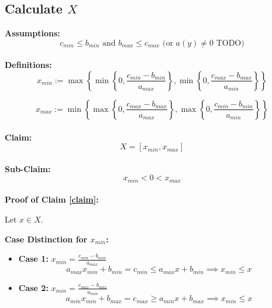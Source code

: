 \subsection{Calculate \texorpdfstring{$X$}{X}}
\textbf{Assumptions:}
\begin{equation}
	c_{min} \leq b_{min} \text{ and } b_{max} \leq c_{max} \text{ (or } a(y) \neq 0 \text{ TODO)}
\end{equation}
\\
\textbf{Definitions:}
\begin{equation}
	x_{min} := \max \left\{ \min\left\{ 0, \frac{c_{min} - b_{min}}{a_{max}} \right\}, \min\left\{ 0, \frac{c_{max} - b_{max}}{a_{min}} \right\} \right\}
\end{equation}

\begin{equation}
	x_{max} := \min \left\{ \max\left\{ 0, \frac{c_{max} - b_{max}}{a_{max}} \right\}, \max\left\{ 0, \frac{c_{min} - b_{min}}{a_{min}} \right\} \right\}
\end{equation}
\\
\textbf{Claim:}
\begin{equation}\label{claim}
	X = [x_{min}, x_{max}]
\end{equation}
\\
\textbf{Sub-Claim:}
\begin{equation}
	x_{min} < 0 < x_{max}
\end{equation}
\\
\textbf{Proof of Claim \eqref{claim}:}

Let \( x \in X \).

\textbf{Case Distinction for \( x_{min} \):}

\begin{itemize}
	\item \textbf{Case 1:} \( x_{min} = \frac{c_{min} - b_{min}}{a_{max}} \)
	      \begin{equation}
		      a_{max} x_{min} + b_{min} = c_{min} \leq a_{max} x + b_{min} \implies x_{min} \leq x
	      \end{equation}

	\item \textbf{Case 2:} \( x_{min} = \frac{c_{max} - b_{max}}{a_{min}} \)
	      \begin{equation}
		      a_{min} x_{min} + b_{max} = c_{max} \geq a_{min} x + b_{max} \implies x_{min} \leq x
	      \end{equation}
\end{itemize}

